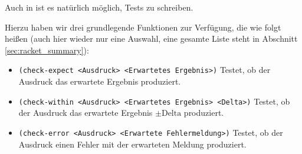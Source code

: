 
Auch in \racketText ist es natürlich möglich, Tests zu schreiben.

Hierzu haben wir drei grundlegende Funktionen zur Verfügung, die wie folgt heißen (auch hier wieder nur eine Auswahl, eine gesamte Liste steht in Abschnitt \ref{sec:racket_summary}):
\begin{itemize}
	\item \lstinline[language = Racket]|(check-expect <Ausdruck> <Erwartetes Ergebnis>)| Testet, ob der Ausdruck das erwartete Ergebnis produziert.
	\item \lstinline[language = Racket]|(check-within <Ausdruck> <Erwartetes Ergebnis> <Delta>)| Testet, ob der Ausdruck das erwartete Ergebnis \( \pm\text{Delta} \) produziert.
	\item \lstinline[language = Racket]|(check-error <Ausdruck> <Erwartete Fehlermeldung>)| Testet, ob der Ausdruck einen Fehler mit der erwarteten Meldung produziert.
\end{itemize}
